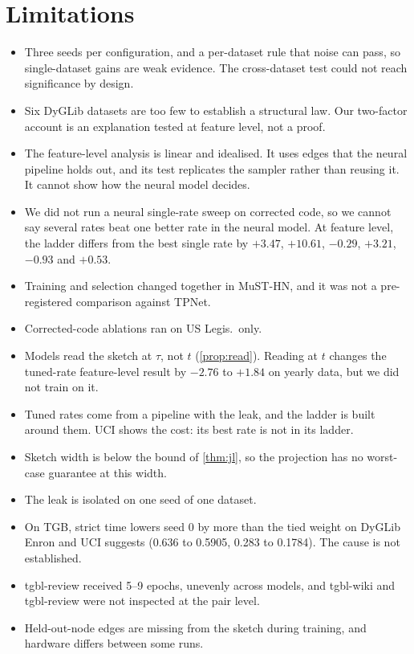 \documentclass[11pt,a4paper]{article}
\theoremstyle{plain}
\theoremstyle{definition}
\begin{document}
\section{Limitations}\label{sec:limits}
\begin{itemize}\itemsep1pt
\item Three seeds per configuration, and a per-dataset rule that noise can pass, so single-dataset gains are weak evidence. The cross-dataset test could not reach significance by design.
\item Six DyGLib datasets are too few to establish a structural law. Our two-factor account is an explanation tested at feature level, not a proof.
\item The feature-level analysis is linear and idealised. It uses edges that the neural pipeline holds out, and its test replicates the sampler rather than reusing it. It cannot show how the neural model decides.
\item We did not run a neural single-rate sweep on corrected code, so we cannot say several rates beat one better rate in the neural model. At feature level, the ladder differs from the best single rate by $+3.47$, $+10.61$, $-0.29$, $+3.21$, $-0.93$ and $+0.53$.
\item Training and selection changed together in MuST-HN, and it was not a pre-registered comparison against TPNet.
\item Corrected-code ablations ran on US Legis.\ only.
\item Models read the sketch at $\tau$, not $t$ (\cref{prop:read}). Reading at $t$ changes the tuned-rate feature-level result by $-2.76$ to $+1.84$ on yearly data, but we did not train on it.
\item Tuned rates come from a pipeline with the leak, and the ladder is built around them. UCI shows the cost: its best rate is not in its ladder.
\item Sketch width is below the bound of \cref{thm:jl}, so the projection has no worst-case guarantee at this width.
\item The leak is isolated on one seed of one dataset.
\item On TGB, strict time lowers seed 0 by more than the tied weight on DyGLib Enron and UCI suggests (0.636 to 0.5905, 0.283 to 0.1784). The cause is not established.
\item tgbl-review received 5--9 epochs, unevenly across models, and tgbl-wiki and tgbl-review were not inspected at the pair level.
\item Held-out-node edges are missing from the sketch during training, and hardware differs between some runs.
\end{itemize}
\end{document}
